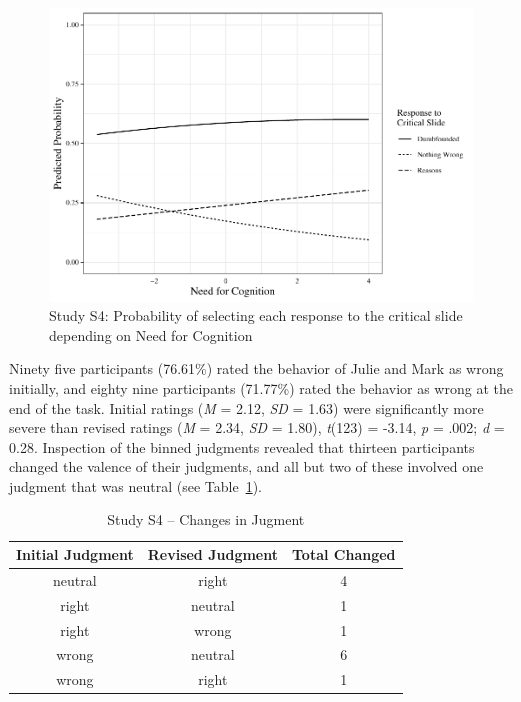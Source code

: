\documentclass[
  american,
  man,floatsintext]{apa7}
\begin{document}
\begin{figure}[!h]
\includegraphics{Supplementary_files/figure-latex/ggplotlogit4-1} \caption{Study S4: Probability of selecting each response to the critical slide depending on Need for Cognition}\label{fig:ggplotlogit4}
\end{figure}

Ninety five participants (76.61\%) rated the behavior of Julie and Mark as wrong initially, and eighty nine participants (71.77\%) rated the behavior as wrong at the end of the task. Initial ratings (\emph{M} = 2.12, \emph{SD} = 1.63) were significantly more severe than revised ratings (\emph{M} = 2.34, \emph{SD} = 1.80), \emph{t}(123) = -3.14, \emph{p} = .002; \emph{d} = 0.28. Inspection of the binned judgments revealed that thirteen participants changed the valence of their judgments, and all but two of these involved one judgment that was neutral (see Table~\ref{tab:tabS4change}).

\begin{table}[tbp]

\begin{center}
\begin{threeparttable}

\caption{\label{tab:tabS4change}Study S4 – Changes in Jugment}

\begin{tabular}{ccc}
\toprule
Initial Judgment & \multicolumn{1}{c}{Revised Judgment} & \multicolumn{1}{c}{Total Changed}\\
\midrule
neutral & right & 4\\
right & neutral & 1\\
right & wrong & 1\\
wrong & neutral & 6\\
wrong & right & 1\\
\bottomrule
\end{tabular}

\end{threeparttable}
\end{center}

\end{table}
\end{document}
